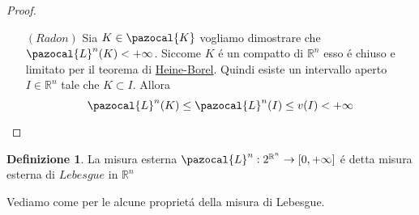 \documentclass[11pt,a4paper]{report}
\theoremstyle{plain}
\theoremstyle{definition}
\newtheorem{defn}[thm]{Definizione} %
\newcommand{\K}{\pazocal{K}}
\newcommand{\Le}{\pazocal{L}}
\begin{document}
\begin{proof}
\begin{itemize}
\begin{itemize}
			Per monotonia otteniamo che $\Le^n(A) \le \Le^n(B)$.\\
			Ora $\{I_j^{(h)}\}$ \'e un ricoprimento di $A$ ma lo \'e anche di $G_h$ per come \'e definito. Quindi ricopre sicuramente anche l'intersezione $\bigcap\limits_hG_h = B$. Dunque vale:
			\[
				\Le^n(B) \le \sum\limits_{j}v(I_j^{(h)})
			\]
			Poich\'e $\Le^n(B)$ \'e la misura minore di tutti i ricoprimenti di $B$. Inoltre per definizione:
			\[
				\sum\limits_{j}v(I_j^{(h)}) \le \Le^n(A)+\frac{1}{h}	
			\]
			Quindi tirando le somme:
			\[
				\Le^n(A) \le \Le^n(B) \le \Le^n(A)+\frac{1}{h}	
			\]
			Sparando $h \rightarrow +\infty$ otteniamo che $\Le^n(B) = \Le^n(A)$ e dunque che la misura \'e Borel-regolare.
			\item[$(Radon)$] Sia $K \in \K$ vogliamo dimostrare che $\Le^n(K) < + \infty$. Siccome $K$ \'e un compatto di $\mathbb{R}^n$ esso \'e chiuso e limitato per il teorema di \href{https://it.wikipedia.org/wiki/Teorema_di_Heine-Borel}{\color{blue}Heine-Borel}. Quindi esiste un intervallo aperto $I \in \mathbb{R}^n$ tale che $K\subset I$. Allora
			\[
				\Le^n(K) \le \Le^n(I) \le v(I) < +\infty			
			\]
		\end{itemize}
	\end{itemize}
\end{proof}
\begin{defn}
	La misura esterna $\Le^n : 2^{\mathbb{R}^n} \rightarrow [0,+\infty]$ \'e detta misura esterna di $Lebesgue$ in $\mathbb{R}^n$
\end{defn}
Vediamo come per le alcune propriet\'a della misura di Lebesgue.
\end{document}
